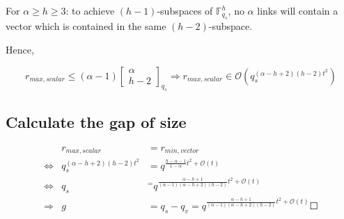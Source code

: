 For $\alpha\geq h\geq3$: to achieve $(h-1)$-subspaces of $\ensuremath{\mathbb{F}}_{q_{s}}^{h}$,
no $\alpha$ links will contain a vector which is contained in the
same $(h-2)$-subspace.

Hence,

\[
r_{max,scalar}\leq\left(\alpha-1\right)\left[\begin{array}{c}
\alpha\\
h-2
\end{array}\right]_{q_{s}}\Rightarrow r_{max,scalar}\in\mathcal{O}\left(q_{s}^{\left(\alpha-h+2\right)\left(h-2\right)t^{2}}\right)
\]


\subsection{Calculate the gap of size}

\begin{eqnarray*}
 & r_{max,scalar} & =r_{min,vector}\\
\Leftrightarrow & q_{s}^{\left(\alpha-h+2\right)\left(h-2\right)t^{2}} & =q^{\frac{h-\alpha-1}{1-\alpha}t^{2}+\mathcal{O}(t)}\\
\Leftrightarrow & q_{s} & ^{=}q^{\frac{\alpha-h+1}{\left(\alpha-1\right)\left(\alpha-h+2\right)\left(h-2\right)}t^{2}+\mathcal{O}(t)}\\
\Rightarrow & g & =q_{s}-q_{v}=q^{\frac{\alpha-h+1}{\left(\alpha-1\right)\left(\alpha-h+2\right)\left(h-2\right)}t^{2}+\mathcal{O}(t)}\Square
\end{eqnarray*}

\clearpage